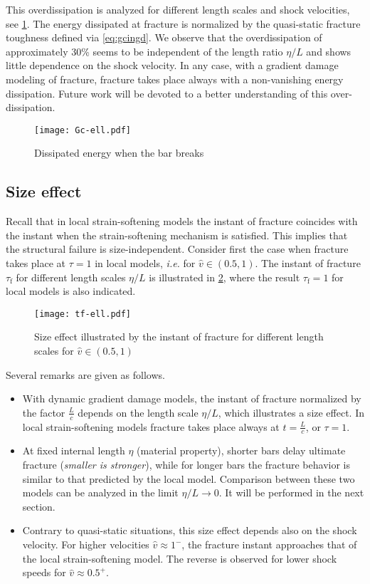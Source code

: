 This overdissipation is analyzed for different length scales and shock velocities, see \cref{fig:Gc-ell}. The energy dissipated at fracture is normalized by the quasi-static fracture toughness defined via \eqref{eq:gcingd}. We observe that the overdissipation of approximately 30\% seems to be independent of the length ratio $\eta/L$ and shows little dependence on the shock velocity. In any case, with a gradient damage modeling of fracture, fracture takes place always with a non-vanishing energy dissipation. Future work will be devoted to a better understanding of this over-dissipation.
\begin{figure}[htbp]
\centering
\texttt{[image: Gc-ell.pdf]}
\caption{Dissipated energy when the bar breaks} \label{fig:Gc-ell}
\end{figure}

\subsection{Size effect}
Recall that in local strain-softening models the instant of fracture coincides with the instant when the strain-softening mechanism is satisfied. This implies that the structural failure is size-independent. Consider first the case when fracture takes place at $\tau=1$ in local models, \emph{i.e.} for $\widehat{v}\in(0.5,1)$. The instant of fracture $\tau_\mathrm{f}$ for different length scales $\eta/L$ is illustrated in \cref{fig:tfell}, where the result $\tau_\mathrm{f}=1$ for local models is also indicated.
\begin{figure}[htbp]
\centering
\texttt{[image: tf-ell.pdf]}
\caption{Size effect illustrated by the instant of fracture for different length scales for $\widehat{v}\in(0.5,1)$} \label{fig:tfell}
\end{figure}
Several remarks are given as follows.
\begin{itemize}
\item With dynamic gradient damage models, the instant of fracture normalized by the factor $\frac{L}{c}$ depends on the length scale $\eta/L$, which illustrates a size effect. In local strain-softening models fracture takes place always at $t=\frac{L}{c}$, or $\tau=1$.

\item At fixed internal length $\eta$ (material property), shorter bars delay ultimate fracture (\emph{smaller is stronger}), while for longer bars the fracture behavior is similar to that predicted by the local model. Comparison between these two models can be analyzed in the limit $\eta/L\to 0$. It will be performed in the next section.

\item Contrary to quasi-static situations, this size effect depends also on the shock velocity. For higher velocities $\widehat{v}\approx 1^-$, the fracture instant approaches that of the local strain-softening model. The reverse is observed for lower shock speeds for $\widehat{v}\approx 0.5^+$.
\end{itemize}

